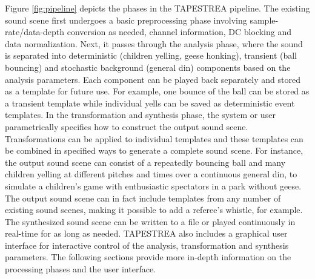 \documentclass[review]{acmsiggraph}      %
\begin{document}
Figure \ref{fig:pipeline} depicts the phases in the TAPESTREA pipeline. The existing sound scene first
undergoes a basic preprocessing phase involving sample-rate/data-depth 
conversion as needed, channel information, DC blocking and data normalization. Next, it passes through the 
analysis phase, where the sound is separated into deterministic (children yelling, geese honking), 
transient (ball bouncing) and stochastic background (general din) 
components based on the analysis parameters. Each component can be played back separately 
and stored as a template for future use. For example, one bounce of the ball can 
be stored as a transient template while individual yells can be saved as deterministic event 
templates. In the transformation and synthesis phase, the system or user parametrically specifies how to construct the output sound scene. Transformations can be applied to individual 
templates and these templates can be combined in specified ways to generate a complete sound scene. 
For instance, the output sound scene can consist of a repeatedly bouncing ball and many children yelling 
at different pitches and times over a continuous general din, to simulate a 
children's game with enthusiastic spectators in a park without geese. The output sound scene can in fact   
include templates from any number of existing sound scenes, making it possible to add a referee's whistle, 
for example. The synthesized sound scene can be written to a file or played continuously in real-time 
for as long as needed. TAPESTREA also includes a graphical user interface for interactive control 
of the analysis, transformation and synthesis parameters. The following sections provide more in-depth 
information on the processing phases and the user interface. 

\end{document}
